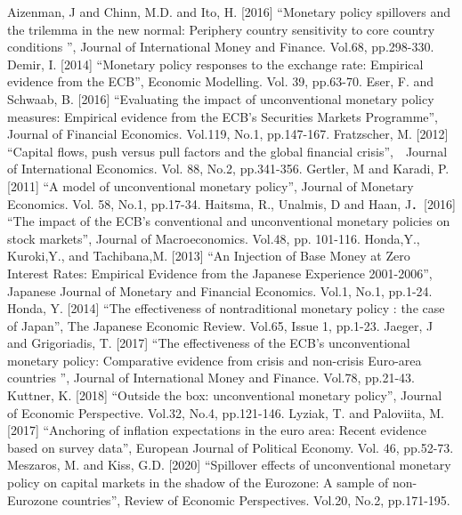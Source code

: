 \documentclass[12pt]{article}
\begin{document}
\begin{thebibliography}{99}

    \bibitem{} Aizenman, J and Chinn, M.D. and Ito, H. [2016] “Monetary policy spillovers and the
    trilemma in the new normal: Periphery country sensitivity to core country conditions
    ”, Journal of International Money and Finance. Vol.68, pp.298-330.
    \bibitem{} Demir, I. [2014] “Monetary policy responses to the exchange rate: Empirical evidence
    from the ECB”, Economic Modelling. Vol. 39, pp.63-70.
    \bibitem{} Eser, F. and Schwaab, B. [2016] “Evaluating the impact of unconventional monetary
    policy measures: Empirical evidence from the ECB's Securities Markets Programme”, Journal of Financial Economics. Vol.119, No.1, pp.147-167.
    \bibitem{} Fratzscher, M. [2012] “Capital flows, push versus pull factors and the global financial
    crisis”,　Journal of International Economics. Vol. 88, No.2, pp.341-356.
    \bibitem{} Gertler, M and Karadi, P. [2011] “A model of unconventional monetary policy”,
    Journal of Monetary Economics. Vol. 58, No.1, pp.17-34.
    \bibitem{} Haitsma, R., Unalmis, D and Haan, J．[2016] “The impact of the ECB's conventional
    and unconventional monetary policies on stock markets”, Journal of Macroeconomics.
    Vol.48, pp. 101-116.
    \bibitem{} Honda,Y., Kuroki,Y., and Tachibana,M. [2013] “An Injection of Base Money at
    Zero Interest Rates: Empirical Evidence from the Japanese Experience 2001-2006”,
    Japanese Journal of Monetary and Financial Economics. Vol.1, No.1, pp.1-24.
    \bibitem{} Honda, Y. [2014] “The effectiveness of nontraditional monetary policy : the case of
    Japan”, The Japanese Economic Review. Vol.65, Issue 1, pp.1-23.
    \bibitem{} Jaeger, J and Grigoriadis, T. [2017] “The effectiveness of the ECB's unconventional
    monetary policy: Comparative evidence from crisis and non-crisis Euro-area countries
    ”, Journal of International Money and Finance. Vol.78, pp.21-43.
    \bibitem{} Kuttner, K. [2018] “Outside the box: unconventional monetary policy”, Journal of
    Economic Perspective. Vol.32, No.4, pp.121-146.
    \bibitem{} Lyziak, T. and Paloviita, M. [2017] “Anchoring of inflation expectations in the
    euro area: Recent evidence based on survey data”, European Journal of Political
    Economy. Vol. 46, pp.52-73.
    \bibitem{} Meszaros, M. and Kiss, G.D. [2020] “Spillover effects of unconventional monetary
    policy on capital markets in the shadow of the Eurozone: A sample of non-Eurozone
    countries”, Review of Economic Perspectives. Vol.20, No.2, pp.171-195.

\end{thebibliography}
\end{document}
